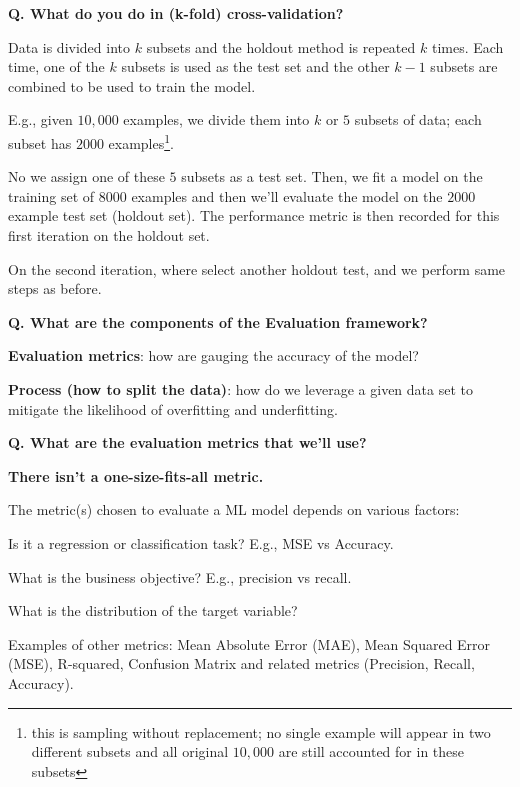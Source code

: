 \begin{frame}[fragile]{\textbf{Q. What do you do in (k-fold) cross-validation?}}
  \begin{wideitemize}
    \item Data is divided into $k$ subsets and the holdout method is repeated
    $k$ times. Each time, one of the $k$ subsets is used as the test set and the
    other $k-1$ subsets are combined to be used to train the model.
    \item E.g., given $10,000$ examples, we divide them into $k$ or $5$ subsets
    of data; each subset has $2000$ examples\footnote{this is sampling without replacement;
    no single example will appear in two different subsets and all original $10,000$
    are still accounted for in these subsets}.
    \item No we assign one of these $5$ subsets as a test set. Then, we fit a model
    on the training set of $8000$ examples and then we'll evaluate the model on
    the $2000$ example test set (holdout set). The performance metric is then
    recorded for this first iteration on the holdout set.
    \item On the second iteration, where select another holdout test, and we perform
    same steps as before.
  \end{wideitemize}
\end{frame}


\begin{frame}[fragile]{\textbf{Q. What are the components of the Evaluation framework?}}
  \begin{wideitemize}
    \item \textbf{Evaluation metrics}: how are gauging the accuracy of the model?
    \item \textbf{Process (how to split the data)}: how do we leverage a given
    data set to mitigate the likelihood of overfitting and underfitting.
  \end{wideitemize}
\end{frame}

\begin{frame}[fragile]{\textbf{Q. What are the evaluation metrics that we'll use?}}
\begin{wideitemize}
  \item {\large \textbf{There isn't a one-size-fits-all metric.}}
  \item The metric(s) chosen to evaluate a ML model depends on various factors:
  \begin{wideitemize}
    \item Is it a regression or classification task? E.g., MSE vs Accuracy.
    \item What is the business objective? E.g., precision vs recall.
    \item What is the distribution of the target variable?
  \end{wideitemize}
  \item Examples of other metrics: Mean Absolute Error (MAE), Mean Squared Error
    (MSE), R-squared, Confusion Matrix and related metrics (Precision, Recall, Accuracy).
\end{wideitemize}
\end{frame}

